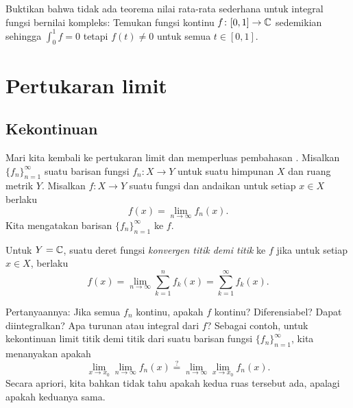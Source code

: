 \begin{exercise}
Buktikan bahwa tidak ada teorema nilai rata-rata sederhana untuk integral
fungsi bernilai kompleks:
Temukan fungsi kontinu $f \colon [0,1] \to {\mathbb{C}}$ sedemikian sehingga
$\int_0^1 f = 0$ tetapi $f(t) \neq 0$ untuk semua $t \in [0,1]$.
\end{exercise}



\sectionnewpage
\section{Pertukaran limit}
\label{sec:swaplim}



\subsection{Kekontinuan}

Mari kita kembali ke pertukaran limit dan memperluas pembahasan
.
Misalkan $\{ f_n \}_{n=1}^\infty$ suatu barisan
fungsi $f_n \colon X \to Y$ untuk suatu himpunan $X$ dan ruang metrik $Y$.
Misalkan $f \colon X \to Y$ suatu
fungsi dan andaikan untuk setiap $x \in X$ berlaku
\begin{equation*}
f(x) = \lim_{n\to \infty} f_n(x) .
\end{equation*}
Kita mengatakan barisan $\{ f_n \}_{n=1}^\infty$
\emph{} ke $f$.

Untuk $Y={\mathbb{C}}$, suatu deret fungsi
\emph{konvergen titik demi titik} ke $f$ jika
untuk setiap $x \in X$, berlaku
\begin{equation*}
f(x) = \lim_{n\to \infty} \sum_{k=1}^n f_k(x) =
\sum_{k=1}^\infty f_k(x) .
\end{equation*}

\medskip

Pertanyaannya:
Jika semua $f_n$ kontinu, apakah $f$ kontinu?  Diferensiabel?
Dapat diintegralkan?  Apa turunan atau integral dari $f$?
Sebagai contoh, untuk kekontinuan limit titik demi titik dari suatu barisan
fungsi
$\{ f_n \}_{n=1}^\infty$, kita menanyakan apakah
\begin{equation*}
\lim_{x\to x_0} \lim_{n\to\infty} f_n(x)
\overset{?}{=}
\lim_{n\to\infty} \lim_{x\to x_0} f_n(x) .
\end{equation*}
Secara apriori, kita bahkan tidak tahu apakah kedua ruas tersebut ada,
apalagi apakah keduanya sama.

